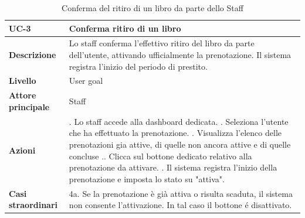 \documentclass[twoside,openright,titlepage,fleqn,headinclude,12pt,a4paper,BCOR=5mm,footinclude]{scrbook}
\begin{document}
\begin{table}[H]
    \centering
    \begin{tabular}{|>{\raggedright\arraybackslash}m{2.5cm}|>{\raggedright\arraybackslash}m{10cm}|}
        \hline
        \textbf{UC-3} & \textbf{Conferma ritiro di un libro} \\
        \hline
        \textbf{Descrizione} & Lo staff conferma l'effettivo ritiro del libro da parte dell'utente, attivando ufficialmente la prenotazione. Il sistema registra l'inizio del periodo di prestito. \\
        \hline
        \textbf{Livello} & User goal \\
        \hline
        \textbf{Attore principale} & Staff \\
        \hline
        \textbf{Azioni} & 
        1. Lo staff accede alla dashboard dedicata. \newline
        2. Seleziona l’utente che ha effettuato la prenotazione. \newline
        3. Visualizza l’elenco delle prenotazioni gia attive, di quelle non ancora attive e di quelle concluse .\newline
        4. Clicca sul bottone dedicato relativo alla prenotazione da attivare. \newline
        5. Il sistema registra l’inizio della prenotazione e imposta lo stato su "attiva". \\
        \hline
        \textbf{Casi straordinari} & 
        4a. Se la prenotazione è già attiva o risulta scaduta, il sistema non consente l’attivazione. In tal caso il bottone é disattivato.  \\
        \hline
    \end{tabular}
    \caption{Conferma del ritiro di un libro da parte dello Staff}
    \label{tab:confirm_pickup}
\end{table}
\end{document}
